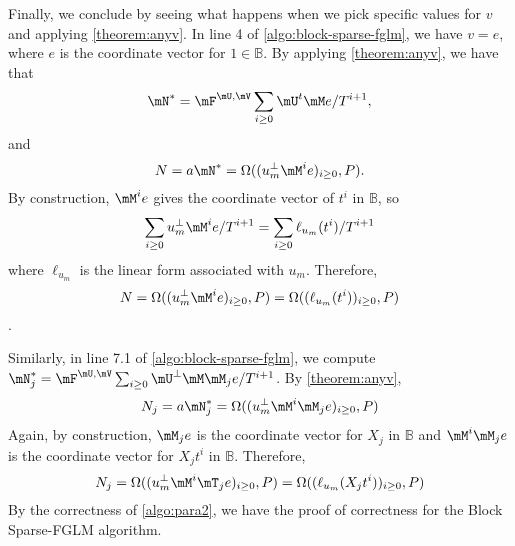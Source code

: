 \documentclass[12pt]{article}
\begin{document}
Finally, we conclude by seeing what happens
when we pick specific values for $v$ and applying \cref{theorem:anyv}.
In line 4 of \cref{algo:block-sparse-fglm}, we have $v = e$, 
where $e$ is the coordinate vector for $1 \in \mathbb{B}$.
By applying \cref{theorem:anyv}, we have that
$$\mN^* = \mF^{\mU,\mV}\sum_{i\ge0}\mU^t \mM e/T^{i+1},$$  and
$$N = a\mN^* = \Omega((u_m^{\perp} \mM^i e)_{i\ge 0},P).$$
By construction,
$\mM^i e$ gives the coordinate vector of $t^i$ in $\mathbb{B}$, so
$$\sum_{i\ge 0} u_m^{\perp} \mM^i e/T^{i+1} = \sum_{i\ge0} \ell_{u_m}(t^i)/T^{i+1}$$ 
where $\ell_{u_m}$ is the linear form associated with $u_m$. Therefore, 
$$N = \Omega((u_m^{\perp} \mM^i e)_{i\ge 0},P) = \Omega( (\ell_{u_m}(t^i))_{i\ge 0},P)$$.

Similarly, in line 7.1 of \cref{algo:block-sparse-fglm}, we compute
$\mN^*_j = \mF^{\mU,\mV}\sum_{i\ge0} \mU^{\perp} \mM \mM_j e / T^{i+1}$. By \cref{theorem:anyv},
$$N_j = a \mN^*_j = \Omega((u_m^{\perp} \mM^i \mM_j e)_{i\ge 0},P) $$
Again, by construction, $\mM_j e$ is the coordinate vector for $X_j$ in 
$\mathbb{B}$ and $\mM^i \mM_j e$ is the coordinate vector for $X_jt^i$ in
$\mathbb{B}$. Therefore,
$$ N_j =  \Omega((u_m^{\perp} \mM^i \mT_j e)_{i\ge 0},P) =
 \Omega( (\ell_{u_m}(X_jt^i))_{i\ge 0},P)$$
By the correctness of \cref{algo:para2}, we have the proof
of correctness for the Block Sparse-FGLM algorithm.

\newpage
\end{document}

